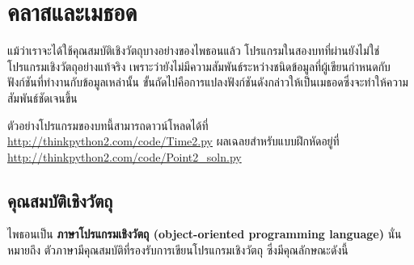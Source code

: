 \chapter{คลาสและเมธอด} %


แม้ว่าเราจะได้ใช้คุณสมบัติเชิงวัตถุบางอย่างของไพธอนแล้ว โปรแกรมในสองบทที่ผ่านยังไม่ใช่โปรแกรมเชิงวัตถุอย่างแท้จริง
เพราะว่ายังไม่มีความสัมพันธ์ระหว่างชนิดข้อมูลที่ผู้เขียนกำหนดกับฟังก์ชันที่ทำงานกับข้อมูลเหล่านั้น 
ขั้นถัดไปคือการแปลงฟังก์ชันดังกล่าวให้เป็นเมธอดซึ่งจะทำให้ความสัมพันธ์ชัดเจนขึ้น



ตัวอย่างโปรแกรมของบทนี้สามารถดาวน์โหลดได้ที่ \url{http://thinkpython2.com/code/Time2.py}
ผลเฉลยสำหรับแบบฝึกหัดอยู่ที่ \url{http://thinkpython2.com/code/Point2_soln.py}

\section{คุณสมบัติเชิงวัตถุ} %


ไพธอนเป็น {\bf ภาษาโปรแกรมเชิงวัตถุ (object-oriented programming language)} นั่นหมายถึง ตัวภาษามีคุณสมบัติที่รองรับการเขียนโปรแกรมเชิงวัตถุ ซึ่งมีคุณลักษณะดังนี้

